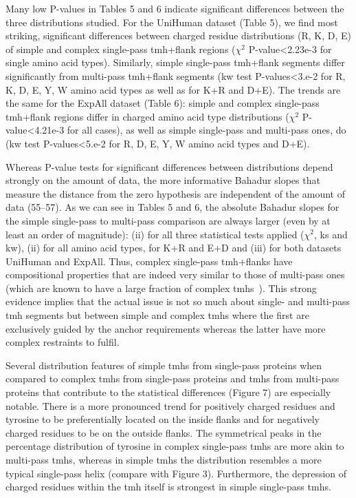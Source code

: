Many low P-values in Tables 5 and 6 indicate significant differences between the three distributions studied. For the UniHuman dataset (Table 5), we find most striking, significant differences between charged residue distributions (R, K, D, E) of simple and complex single-pass \gls{tmh}+flank regions (\({\chi}^{2}\) P-value<2.23e-3 for single amino acid types). Similarly, simple single-pass \gls{tmh}+flank segments differ significantly from multi-pass \gls{tmh}+flank segments (\gls{kw} test P-values<3.e-2 for R, K, D, E, Y, W amino acid types as well as for K+R and D+E). The trends are the same for the ExpAll dataset (Table 6): simple and complex single-pass \gls{tmh}+flank regions differ in charged amino acid type distributions (\({\chi}^{2}\) P-value<4.21e-3 for all cases), as well as simple single-pass and multi-pass ones, do (\gls{kw} test P-values<5.e-2 for R, D, E, Y, W amino acid types and D+E).

Whereas P-value tests for significant differences between distributions depend strongly on the amount of data, the more informative Bahadur slopes that measure the distance from the zero hypothesis are independent of the amount of data (55--57). As we can see in Tables 5 and 6, the absolute Bahadur slopes for the simple single-pass to multi-pass comparison are always larger (even by at least an order of magnitude): (ii) for all three statistical tests applied (\({\chi}^{2}\), \gls{ks} and \gls{kw}), (ii) for all amino acid types, for K+R and E+D and (iii) for both datasets UniHuman and ExpAll. Thus, complex single-pass \gls{tmh}+flanks have compositional properties that are indeed very similar to those of multi-pass ones (which are known to have a large fraction of complex \gls{tmh}s~\cite{Wong2011, Wong2012}). This strong evidence implies that the actual issue is not so much about single- and multi-pass \gls{tmh} segments but between simple and complex \gls{tmh}s where the first are exclusively guided by the anchor requirements whereas the latter have more complex restraints to fulfil.

Several distribution features of simple \gls{tmh}s from single-pass proteins when compared to complex \gls{tmh}s from single-pass proteins and \gls{tmh}s from multi-pass proteins that contribute to the statistical differences (Figure 7) are especially notable. There is a more pronounced trend for positively charged residues and tyrosine to be preferentially located on the inside flanks and for negatively charged residues to be on the outside flanks. The symmetrical peaks in the percentage distribution of tyrosine in complex single-pass \gls{tmh}s are more akin to multi-pass \gls{tmh}s, whereas in simple \gls{tmh}s the distribution resembles a more typical single-pass helix (compare with Figure 3). Furthermore, the depression of charged residues within the \gls{tmh} itself is strongest in simple single-pass \gls{tmh}s.

